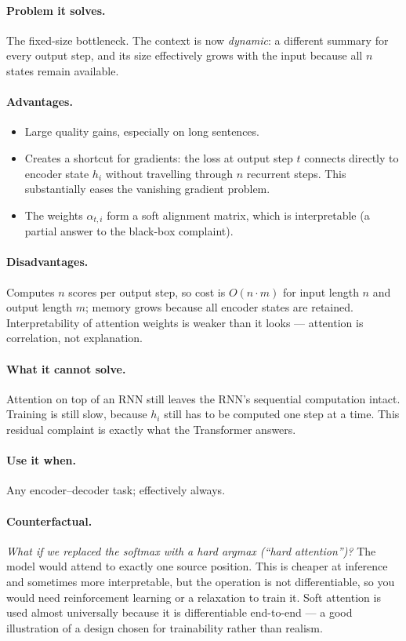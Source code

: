 \documentclass[11pt,a4paper]{article}
\begin{document}
\paragraph{Problem it solves.} The fixed-size bottleneck. The context is now
\emph{dynamic}: a different summary for every output step, and its size effectively grows
with the input because all $n$ states remain available.

\paragraph{Advantages.}
\begin{itemize}
\item Large quality gains, especially on long sentences.
\item Creates a shortcut for gradients: the loss at output step $t$ connects directly to
  encoder state $h_i$ without travelling through $n$ recurrent steps. This substantially
  eases the vanishing gradient problem.
\item The weights $\alpha_{t,i}$ form a soft alignment matrix, which is interpretable
  (a partial answer to the black-box complaint).
\end{itemize}

\paragraph{Disadvantages.} Computes $n$ scores per output step, so cost is $O(n \cdot m)$
for input length $n$ and output length $m$; memory grows because all encoder states are
retained. Interpretability of attention weights is weaker than it looks --- attention is
correlation, not explanation.

\paragraph{What it cannot solve.} Attention on top of an RNN still leaves the RNN's
sequential computation intact. Training is still slow, because $h_i$ still has to be
computed one step at a time. This residual complaint is exactly what the Transformer
answers.

\paragraph{Use it when.} Any encoder--decoder task; effectively always.

\paragraph{Counterfactual.} \emph{What if we replaced the softmax with a hard argmax
(``hard attention'')?} The model would attend to exactly one source position. This is
cheaper at inference and sometimes more interpretable, but the operation is not
differentiable, so you would need reinforcement learning or a relaxation to train it.
Soft attention is used almost universally because it is differentiable end-to-end --- a
good illustration of a design chosen for trainability rather than realism.
\end{document}
